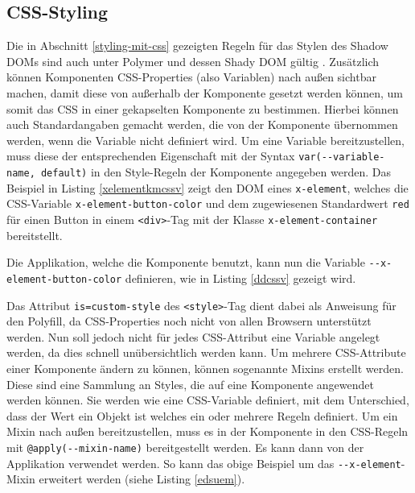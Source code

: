 


\subsection{CSS-Styling}\label{css-styling}

Die in Abschnitt \ref{styling-mit-css} gezeigten Regeln für das Stylen des Shadow \ac{DOM}s sind auch unter Polymer und dessen Shady \ac{DOM} gültig \cite{citeulike:13915080}. Zusätzlich können Komponenten \ac{CSS}-Properties (also Variablen) nach außen sichtbar machen, damit diese von außerhalb der Komponente gesetzt werden können, um somit das \ac{CSS} in einer gekapselten Komponente zu bestimmen. Hierbei können auch Standardangaben gemacht werden, die von der Komponente übernommen werden, wenn die Variable nicht definiert wird. Um eine Variable bereitzustellen, muss diese der entsprechenden Eigenschaft mit der Syntax \texttt{var(-\/-variable-name,\ default)} in den Style-Regeln der Komponente angegeben werden. Das Beispiel in Listing \ref{xelementkmcssv} zeigt den \ac{DOM} eines \texttt{x-element}, welches die \ac{CSS}-Variable \texttt{x-element-button-color} und dem zugewiesenen Standardwert \texttt{red} für einen Button in einem \texttt{\textless{}div\textgreater{}}-Tag mit der Klasse \texttt{x-element-container} bereitstellt.



Die Applikation, welche die Komponente benutzt, kann nun die Variable \texttt{-\/-x-element-button-color} definieren, wie in Listing \ref{ddcssv} gezeigt wird.



Das Attribut \texttt{is=\dq custom-style\dq} des \texttt{\textless{}style\textgreater{}}-Tag dient dabei als Anweisung für den Polyfill, da \ac{CSS}-Properties noch nicht von allen Browsern unterstützt werden. Nun soll jedoch nicht für jedes \ac{CSS}-Attribut eine Variable angelegt werden, da dies schnell unübersichtlich werden kann. Um mehrere \ac{CSS}-Attribute einer Komponente ändern zu können, können sogenannte Mixins erstellt werden. Diese sind eine Sammlung an Styles, die auf eine Komponente angewendet werden können. Sie werden wie eine \ac{CSS}-Variable definiert, mit dem Unterschied, dass der Wert ein Objekt ist welches ein oder mehrere Regeln definiert. Um ein Mixin nach außen bereitzustellen, muss es in der Komponente in den \ac{CSS}-Regeln mit \texttt{@apply(-\/-mixin-name)} bereitgestellt werden. Es kann dann von der Applikation verwendet werden. So kann das obige Beispiel um das \texttt{-\/-x-element}-Mixin erweitert werden (siehe Listing \ref{edsuem}).

